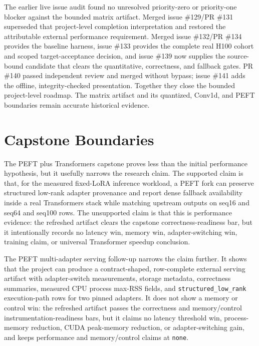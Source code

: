 \documentclass[11pt]{article}
\begin{document}
The earlier live issue audit found no unresolved priority-zero or priority-one
blocker against the bounded matrix artifact. Merged issue \#129/PR \#131
superseded that project-level completion interpretation and restored the
attributable external performance requirement. Merged issue \#132/PR \#134
provides the baseline harness, issue \#133 provides the complete real H100
cohort and scoped target-acceptance decision, and issue \#139 now supplies the
source-bound candidate that clears the quantitative, correctness, and fallback
gates. PR \#140 passed independent review and merged without bypass; issue
\#141 adds the offline, integrity-checked presentation. Together they close the
bounded project-level roadmap. The matrix artifact and its quantized, Conv1d,
and PEFT boundaries remain accurate historical evidence.

\section{Capstone Boundaries}

The PEFT plus Transformers capstone proves less than the initial performance
hypothesis, but it usefully narrows the research claim. The supported claim is
that, for the measured fixed-LoRA inference workload, a PEFT fork can preserve
structured low-rank adapter provenance and report dense fallback availability
inside a real Transformers stack while matching upstream outputs on seq16 and
seq64 and seq100 rows. The unsupported claim is that this is performance
evidence: the refreshed artifact clears the capstone correctness-readiness
bar, but it intentionally records no latency win, memory win, adapter-switching
win, training claim, or universal Transformer speedup conclusion.

The PEFT multi-adapter serving follow-up narrows the claim further. It shows
that the project can produce a contract-shaped, row-complete external serving
artifact with adapter-switch measurements, storage metadata, correctness
summaries, measured CPU process max-RSS fields, and
\texttt{structured\_low\_rank} execution-path rows for two pinned adapters. It
does not show a memory or control win: the refreshed artifact passes the
correctness and
memory/control instrumentation-readiness bars, but it claims no latency
threshold win, process-memory reduction, CUDA peak-memory reduction, or
adapter-switching gain, and keeps performance and memory/control claims at
\texttt{none}.
\end{document}

